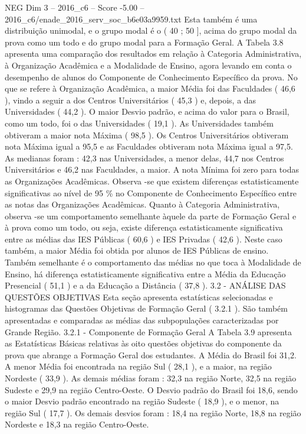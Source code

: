 \begin{textsample}{NEG Dim 3 – 2016\_c6 – Score -5.00 – 2016\_c6/enade\_2016\_serv\_soc\_b6e03a9959.txt}
Esta também é uma distribuição unimodal, e o grupo modal é o ( 40 ; 50 ], acima do grupo modal da prova como um todo e do grupo modal para a Formação Geral.
A Tabela 3.8 apresenta uma comparação dos resultados em relação à Categoria Administrativa, à Organização Acadêmica e a Modalidade de Ensino, agora levando em conta o desempenho de alunos do Componente de Conhecimento Específico da prova.
No que se refere à Organização Acadêmica, a maior Média foi das Faculdades ( 46,6 ), vindo a seguir a dos Centros Universitários ( 45,3 ) e, depois, a das Universidades ( 44,2 ).
O maior Desvio padrão, e acima do valor para o Brasil, como um todo, foi o das Universidades ( 19,1 ).
As Universidades também obtiveram a maior nota Máxima ( 98,5 ).
Os Centros Universitários obtiveram nota Máxima igual a 95,5 e as Faculdades obtiveram nota Máxima igual a 97,5.
As medianas foram : 42,3 nas Universidades, a menor delas, 44,7 nos Centros Universitários e 46,2 nas Faculdades, a maior.
A nota Mínima foi zero para todas as Organizações Acadêmicas.
Observa -se que existem diferenças estatisticamente significativas ao nível de 95 \% no Componente de Conhecimento Específico entre as notas das Organizações Acadêmicas.
Quanto à Categoria Administrativa, observa -se um comportamento semelhante àquele da parte de Formação Geral e à prova como um todo, ou seja, existe diferença estatisticamente significativa entre as médias das IES Públicas ( 60,6 ) e IES Privadas ( 42,6 ).
Neste caso também, a maior Média foi obtida por alunos de IES Públicas de ensino.
Também semelhante é o comportamento das médias no que toca à Modalidade de Ensino, há diferença estatisticamente significativa entre a Média da Educação Presencial ( 51,1 ) e a da Educação a Distância ( 37,8 ). 3.2 - ANÁLISE DAS QUESTÕES OBJETIVAS Esta seção apresenta estatísticas selecionadas e histogramas das Questões Objetivas de Formação Geral ( 3.2.1 ).
São também apresentadas e comparadas as médias das subpopulações caracterizadas por Grande Região. 3.2.1 - Componente de Formação Geral A Tabela 3.9 apresenta as Estatísticas Básicas relativas às oito questões objetivas do componente da prova que abrange a Formação Geral dos estudantes.
A Média do Brasil foi 31,2.
A menor Média foi encontrada na região Sul ( 28,1 ), e a maior, na região Nordeste ( 33,9 ).
As demais médias foram : 32,3 na região Norte, 32,5 na região Sudeste e 29,9 na região Centro-Oeste.
O Desvio padrão do Brasil foi 18,6, sendo o maior Desvio padrão encontrado na região Sudeste ( 18,9 ), e o menor, na região Sul ( 17,7 ).
Os demais desvios foram : 18,4 na região Norte, 18,8 na região Nordeste e 18,3 na região Centro-Oeste.

\end{textsample}

